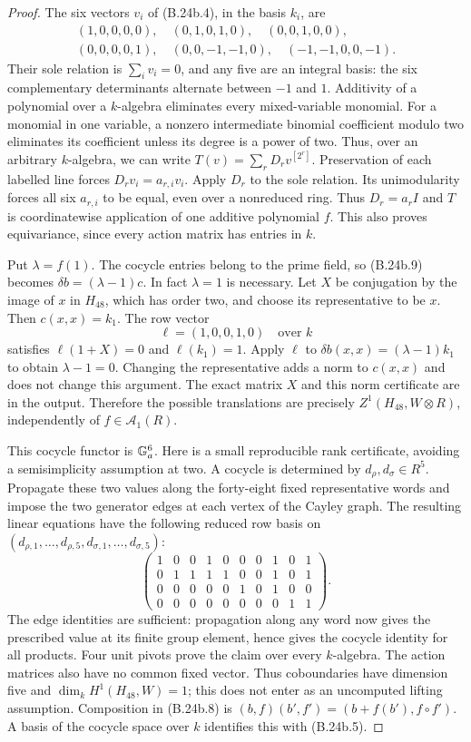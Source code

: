 \begin{proof}
The six vectors $v_i$ of (B.24b.4), in the basis $k_i$, are
\[
\begin{gathered}
 (1,0,0,0,0),\quad(0,1,0,1,0),\quad(0,0,1,0,0),\\
 (0,0,0,0,1),\quad(0,0,-1,-1,0),\quad(-1,-1,0,0,-1).
\end{gathered}
\]
Their sole relation is $\sum_i v_i=0$, and any five are an integral
basis: the six complementary determinants alternate between $-1$ and
$1$.  Additivity of a polynomial over a $k$-algebra eliminates every
mixed-variable monomial.  For a monomial in one variable, a nonzero
intermediate binomial coefficient modulo two eliminates its coefficient
unless its degree is a power of two.  Thus, over an arbitrary
$k$-algebra, we can write
$T(v)=\sum_r D_r v^{[2^r]}$.  Preservation of each labelled line
forces $D_rv_i=a_{r,i}v_i$.  Apply $D_r$ to the sole relation.
Its unimodularity forces all six $a_{r,i}$ to be equal, even over a
nonreduced ring.  Thus $D_r=a_rI$ and $T$ is coordinatewise application
of one additive polynomial $f$.  This also proves equivariance,
since every action matrix has entries in $k$.

Put $\lambda=f(1)$.  The cocycle entries belong to the prime field,
so (B.24b.9) becomes
$\delta b=(\lambda-1)c$.  In fact $\lambda=1$ is necessary.
Let $X$ be conjugation by the image of $x$ in $H_{48}$, which has
order two, and choose its representative to be $x$.
Then $c(x,x)=k_1$.  The row vector
\[
                    \ell=(1,0,0,1,0)\quad\text{over }k
\]
satisfies $\ell(1+X)=0$ and $\ell(k_1)=1$.
Apply $\ell$ to $\delta b(x,x)=(\lambda-1)k_1$ to obtain
$\lambda-1=0$.  Changing the representative adds a norm to
$c(x,x)$ and does not change this argument.  The exact matrix $X$
and this norm certificate are in the output.  Therefore the possible
translations are precisely $Z^1(H_{48},W\otimes R)$, independently
of $f\in\mathscr A_1(R)$.

This cocycle functor is $\mathbb G_a^6$.  Here is a small reproducible rank
certificate, avoiding a semisimplicity assumption at two.  A cocycle
is determined by $d_\rho,d_\sigma\in R^5$.  Propagate these two
values along the forty-eight fixed representative words and impose
the two generator edges at each vertex of the Cayley graph.  The
resulting linear equations have the following reduced row basis on
$(d_{\rho,1},\ldots,d_{\rho,5},d_{\sigma,1},\ldots,d_{\sigma,5})$:
\[
 \begin{pmatrix}
 1&0&0&1&0&0&0&1&0&1\\
 0&1&1&1&1&0&0&1&0&1\\
 0&0&0&0&0&1&0&1&0&0\\
 0&0&0&0&0&0&0&0&1&1
 \end{pmatrix}.
 \tag{B.24b.10}
\]
The edge identities are sufficient: propagation along any word now
gives the prescribed value at its finite group element, hence gives
the cocycle identity for all products.  Four unit pivots prove the
claim over every $k$-algebra.  The action matrices also have no common
fixed vector.  Thus coboundaries have dimension five and
$\dim_kH^1(H_{48},W)=1$; this does not enter as an uncomputed
lifting assumption.  Composition in (B.24b.8) is
$(b,f)(b',f')=(b+f(b'),f\circ f')$.  A basis of the cocycle space
over $k$ identifies this with (B.24b.5).


\end{proof}
